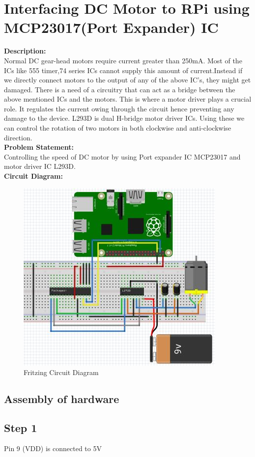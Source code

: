 \documentclass[a4paper,12pt,oneside]{book}
\begin{document}
\section{Interfacing DC Motor to RPi using MCP23017(Port Expander) IC}
\textbf{Description:} \\
Normal DC gear-head motors require current greater than 250mA. Most of
the ICs like 555 timer,74 series ICs cannot supply this amount of
current.Instead if we directly connect motors to the output of any of the
above IC's, they might get damaged. There is a need of a circuitry that
can act as a bridge between the above mentioned ICs and the motors. This
is where a motor driver plays a crucial role. It regulates the current owing through the circuit hence preventing any damage to the device.
L293D is dual H-bridge motor driver ICs. Using these we can control the
rotation of two motors in both clockwise and anti-clockwise direction. \\
\textbf{Problem Statement:} \\
Controlling the speed of DC motor by using Port expander IC MCP23017 and motor
driver IC L293D. \\
\newpage
\textbf{Circuit Diagram:}\\
\begin{figure}[H]
    \centering
    \includegraphics[scale=0.6]{dc_motor_I2C}
    \caption{Fritzing Circuit Diagram}
\end{figure}
\subsection*{Assembly of hardware}
\subsection*{Step 1}
Pin 9 (VDD) is connected to 5V
\end{document}
